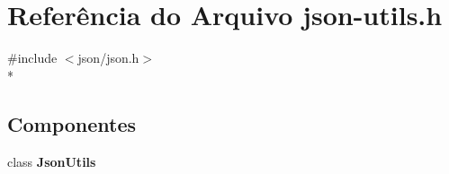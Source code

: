 \section{Referência do Arquivo json-\/utils.h}
\label{json-utils_8h}
{\ttfamily \#include $<$json/json.\+h$>$}\\*
\subsection*{Componentes}
\begin{DoxyCompactItemize}
\item 
class {\bf Json\+Utils}
\end{DoxyCompactItemize}
